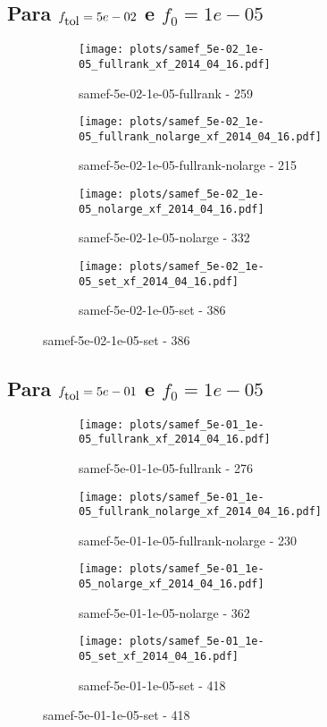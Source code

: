 \newpage
\subsection{Para $f_{\mbox{tol}} = 5e-02$ e $f_0 = 1e-05$}

\begin{figure}[H]
  \centering
  \begin{subfigure}{0.48\textwidth}
    \texttt{[image: plots/samef\_5e-02\_1e-05\_fullrank\_xf\_2014\_04\_16.pdf]}
    \caption{samef-5e-02-1e-05-fullrank - 259}
  \end{subfigure}
  \begin{subfigure}{0.48\textwidth}
    \texttt{[image: plots/samef\_5e-02\_1e-05\_fullrank\_nolarge\_xf\_2014\_04\_16.pdf]}
    \caption{samef-5e-02-1e-05-fullrank-nolarge - 215}
  \end{subfigure}
  \begin{subfigure}{0.48\textwidth}
    \texttt{[image: plots/samef\_5e-02\_1e-05\_nolarge\_xf\_2014\_04\_16.pdf]}
    \caption{samef-5e-02-1e-05-nolarge - 332}
  \end{subfigure}
  \begin{subfigure}{0.48\textwidth}
    \texttt{[image: plots/samef\_5e-02\_1e-05\_set\_xf\_2014\_04\_16.pdf]}
    \caption{samef-5e-02-1e-05-set - 386}
  \end{subfigure}
\end{figure}

\newpage
\subsection{Para $f_{\mbox{tol}} = 5e-01$ e $f_0 = 1e-05$}

\begin{figure}[H]
  \centering
  \begin{subfigure}{0.48\textwidth}
    \texttt{[image: plots/samef\_5e-01\_1e-05\_fullrank\_xf\_2014\_04\_16.pdf]}
    \caption{samef-5e-01-1e-05-fullrank - 276}
  \end{subfigure}
  \begin{subfigure}{0.48\textwidth}
    \texttt{[image: plots/samef\_5e-01\_1e-05\_fullrank\_nolarge\_xf\_2014\_04\_16.pdf]}
    \caption{samef-5e-01-1e-05-fullrank-nolarge - 230}
  \end{subfigure}
  \begin{subfigure}{0.48\textwidth}
    \texttt{[image: plots/samef\_5e-01\_1e-05\_nolarge\_xf\_2014\_04\_16.pdf]}
    \caption{samef-5e-01-1e-05-nolarge - 362}
  \end{subfigure}
  \begin{subfigure}{0.48\textwidth}
    \texttt{[image: plots/samef\_5e-01\_1e-05\_set\_xf\_2014\_04\_16.pdf]}
    \caption{samef-5e-01-1e-05-set - 418}
  \end{subfigure}
\end{figure}

